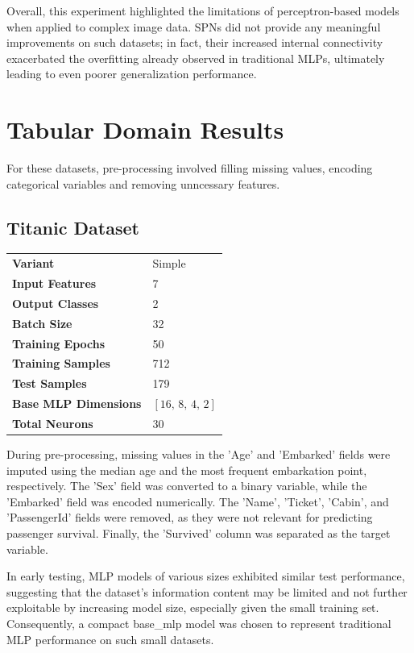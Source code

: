 Overall, this experiment highlighted the limitations of perceptron-based models when applied to complex image data. SPNs did not provide any meaningful improvements on such datasets; in fact, their increased internal connectivity exacerbated the overfitting already observed in traditional MLPs, ultimately leading to even poorer generalization performance.

\section{Tabular Domain Results}

For these datasets, pre-processing involved filling missing values, encoding categorical variables and removing unncessary features.

\subsection{Titanic Dataset}

\begin{tabular}{@{}ll@{}}
\textbf{Variant} & Simple \\
\textbf{Input Features} & 7 \\
\textbf{Output Classes} & 2 \\
\textbf{Batch Size} & 32 \\
\textbf{Training Epochs} & 50 \\
\textbf{Training Samples} & 712 \\
\textbf{Test Samples} & 179 \\
\textbf{Base MLP Dimensions} & $[16,\, 8,\, 4,\, 2]$ \\
\textbf{Total Neurons} & 30 \\
\end{tabular}

\vspace{2pt}

During pre-processing, missing values in the 'Age' and 'Embarked' fields were imputed using the median age and the most frequent embarkation point, respectively. The 'Sex' field was converted to a binary variable, while the 'Embarked' field was encoded numerically. The 'Name', 'Ticket', 'Cabin', and 'PassengerId' fields were removed, as they were not relevant for predicting passenger survival. Finally, the 'Survived' column was separated as the target variable.

In early testing, MLP models of various sizes exhibited similar test performance, suggesting that the dataset’s information content may be limited and not further exploitable by increasing model size, especially given the small training set. Consequently, a compact base\_mlp model was chosen to represent traditional MLP performance on such small datasets.

